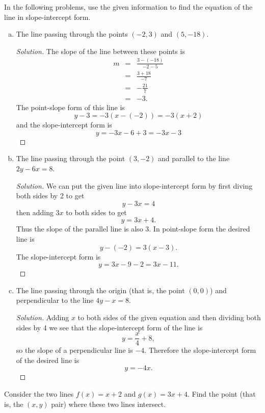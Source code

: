 \documentclass[12pt]{amsart}
\begin{document}
\begin{thm}[16 Points]\label{ex5}
  In the following problems, use the given information to find the equation of the line in slope-intercept form.
  \begin{enumerate}[(a)]
  \item
    The line passing through the points $(-2,3)$ and $(5,-18)$.
    \begin{proof}[Solution]
      The slope of the line between these points is
      \begin{eqnarray*}
        m &=& \frac{3 - (-18)}{-2 - 5}\\
        &=& \frac{3 + 18}{-7}\\
        &=& -\frac{21}{7}\\
        &=& -3.
      \end{eqnarray*}
      The point-slope form of this line is
      \[y - 3 = -3(x - (-2)) = -3(x + 2)\]
      and the slope-intercept form is
      \[y = -3x - 6 + 3 = -3x - 3\]
    \end{proof}
  \item
    The line passing through the point $(3, -2)$ and parallel to the line $2y - 6x = 8$.
    \begin{proof}[Solution]
      We can put the given line into slope-intercept form by first diving both sides by 2 to get
      \[y - 3x = 4\]
      then adding \(3x\) to both sides to get
      \[y = 3x + 4.\]
      Thus the slope of the parallel line is also \(3\).
      In point-slope form the desired line is
      \[y - (-2) = 3(x - 3).\]
      The slope-intercept form is
      \[ y = 3x - 9 - 2 = 3x - 11.\]
    \end{proof}
  \item
    The line passing through the origin (that is, the point $(0,0)$) and perpendicular to the line $4y - x = 8$.
    \begin{proof}[Solution]
      Adding \(x\) to both sides of the given equation and then dividing both sides by 4 we see that the slope-intercept form of the line is
      \[y = \frac{x}{4} + 8,\]
      so the slope of a perpendicular line is \(-4\).
      Therefore the slope-intercept form of the desired line is
      \[y = -4x.\]
    \end{proof}
  \end{enumerate}
\end{thm}

\begin{thm}[16 Points]\label{ex10}
  Consider the two lines $f(x) = x + 2$ and $g(x) = 3x + 4$.
  Find the point (that is, the $(x,y)$ pair) where these two lines intersect.
\end{thm}
\end{document}
